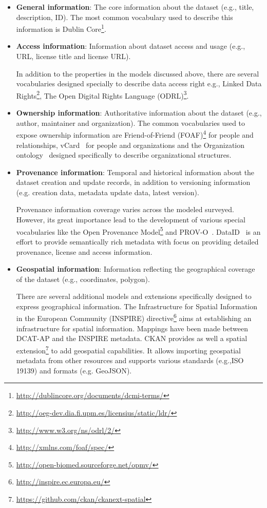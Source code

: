 \documentclass[runningheads,a4paper]{llncs}
\begin{document}
\begin{itemize}
\item \textbf{General information}: The core information about the dataset (e.g., title, description, ID). The most common vocabulary used to describe this information is Dublin Core\footnote{\url{http://dublincore.org/documents/dcmi-terms/}}.
\item \textbf{Access information}: Information about dataset access and usage (e.g., URL, license title and license URL).

In addition to the properties in the models discussed above, there are several vocabularies designed specially to describe data access right e.g., Linked Data Rights\footnote{\url{http://oeg-dev.dia.fi.upm.es/licensius/static/ldr/}}, The Open Digital Rights Language (ODRL)\footnote{\url{http://www.w3.org/ns/odrl/2/}}.

\item \textbf{Ownership information}: Authoritative information about the dataset (e.g., author, maintainer and organization).
The common vocabularies used to expose ownership information are Friend-of-Friend (FOAF)\footnote{\url{http://xmlns.com/foaf/spec/}} for people and relationships, vCard~\cite{vCard:14:W3C} for people and organizations and the Organization ontology~\cite{org:14:W3C} designed specifically to describe organizational structures.

\item \textbf{Provenance information}: Temporal and historical information about the dataset creation and update records, in addition to versioning information (e.g. creation data, metadata update data, latest version).

Provenance information coverage varies across the modeled surveyed. However, its great importance lead to the development of various special vocabularies like the Open Provenance Model\footnote{\url{http://open-biomed.sourceforge.net/opmv/}} and PROV-O~\cite{PROV:13:W3C}. DataID~\cite{Brummer:2014:DTS:2660517.2660538} is an effort to provide semantically rich metadata with focus on providing detailed provenance, license and access information.

\item \textbf{Geospatial information}: Information reflecting the geographical coverage of the dataset (e.g., coordinates, polygon).

There are several additional models and extensions specifically designed to express geographical information. The Infrastructure for Spatial Information in the European Community (INSPIRE) directive\footnote{\url{http://inspire.ec.europa.eu/}} aims at establishing an infrastructure for spatial information. Mappings have been made between DCAT-AP and the INSPIRE metadata. CKAN provides as well a spatial extension\footnote{\url{https://github.com/ckan/ckanext-spatial}} to add geospatial capabilities. It allows importing geospatial metadata from other resources and supports various standards (e.g.,ISO 19139) and formats (e.g. GeoJSON).


\end{itemize}
\end{document}

